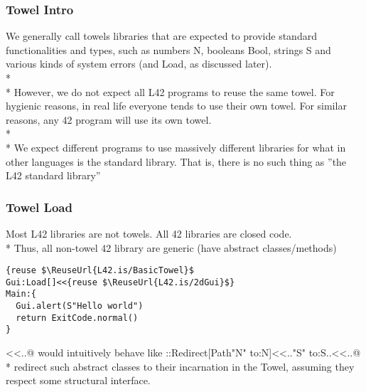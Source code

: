 \begin{frame}[fragile]
\frametitle{Towel Intro}

We generally call towels libraries that are expected to provide standard
functionalities and types, such as numbers N, booleans Bool,
strings S and various kinds of system errors
(and Load, as discussed later).
\\*${}_{}$\\*
However, we do not expect all L42 programs to reuse the same towel.
For hygienic reasons, in real life everyone tends to use their own towel.
For similar reasons, any 42 program will use its own towel.
\\*${}_{}$\\*
We expect different programs to use massively different libraries for
what in other languages is the standard library.
That is, there is no such thing as ''the L42 standard library''
\end{frame}
\begin{frame}[fragile]
\frametitle{Towel Load}


Most L42 libraries are not towels.
All 42 libraries are closed code.
\\*
Thus, all non-towel 42 library are generic
(have abstract classes/methods)

\begin{NiceCode}{59ex}{1}
\begin{lstlisting}
{reuse $\ReuseUrl{L42.is/BasicTowel}$
Gui:Load[]<<{reuse $\ReuseUrl{L42.is/2dGui}$}
Main:{
  Gui.alert(S"Hello world")
  return ExitCode.normal()
}
\end{lstlisting}
\end{NiceCode}
\Q@Load[]<<{..}@
would intuitively behave like 
\Q@Refactor::Redirect[Path"N" to:N]<<.."S" to:S..<<{..}@\\*
\Q@Load@ redirect such abstract classes to their incarnation in the Towel,
assuming they respect some structural interface.

\end{frame}

